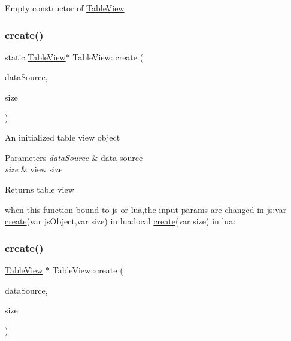 Empty constructor of \hyperlink{classTableView}{Table\+View} \mbox{\label{classTableView_add92e8beb89ba7e76848ec1c07836a1c}} 
\subsubsection{\texorpdfstring{create()}{create()}\hspace{0.1cm}{\footnotesize\ttfamily [3/6]}}
{\footnotesize\ttfamily static \hyperlink{classTableView}{Table\+View}$\ast$ Table\+View\+::create (\begin{DoxyParamCaption}\item[{\hyperlink{classTableViewDataSource}{Table\+View\+Data\+Source} $\ast$}]{data\+Source,  }\item[{\hyperlink{classSize}{Size}}]{size }\end{DoxyParamCaption})\hspace{0.3cm}{\ttfamily [static]}}

An initialized table view object


\begin{DoxyParams}{Parameters}
{\em data\+Source} & data source \\
\hline
{\em size} & view size \\
\hline
\end{DoxyParams}
\begin{DoxyReturn}{Returns}
table view 
\begin{DoxyCode}
when \textcolor{keyword}{this} \textcolor{keyword}{function} bound to js or lua,the input params are changed
in js:var \hyperlink{classTableView_a298f6ec9b9dc31b643b2027e3c91d6a1}{create}(var jsObject,var size)
in lua:local \hyperlink{classTableView_a298f6ec9b9dc31b643b2027e3c91d6a1}{create}(var size)
in lua:
\end{DoxyCode}
 
\end{DoxyReturn}
\mbox{\label{classTableView_af7ff725904118f7caa7fcc447819a6e1}} 
\subsubsection{\texorpdfstring{create()}{create()}\hspace{0.1cm}{\footnotesize\ttfamily [4/6]}}
{\footnotesize\ttfamily \hyperlink{classTableView}{Table\+View} $\ast$ Table\+View\+::create (\begin{DoxyParamCaption}\item[{\hyperlink{classTableViewDataSource}{Table\+View\+Data\+Source} $\ast$}]{data\+Source,  }\item[{\hyperlink{classSize}{Size}}]{size }\end{DoxyParamCaption})\hspace{0.3cm}{\ttfamily [static]}}

